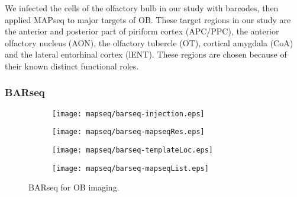 \documentclass[../dissertation.tex]{subfiles}
\begin{document}
We infected the cells of the olfactory bulb in our study with barcodes, then applied MAPseq to major targets of OB.
These target regions in our study are the anterior and posterior part of piriform cortex (APC/PPC), the anterior olfactory nucleus (AON), the olfactory tubercle (OT), cortical amygdala (CoA) and the lateral entorhinal cortex (lENT).
These regions are chosen because of their known distinct functional roles.
~\cite{mapseq034,mapseq063,mapseq064,mapseq065,mapseq066,mapseq067,mapseq068,mapseq069}

\subsubsection{BARseq}

\begin{figure}[p]
    \centering
    \begin{subfigure}[b]{0.55\textwidth}
        \texttt{[image: mapseq/barseq-injection.eps]}
        \label{fig:obbarseq-real}
    \end{subfigure}
    \hfill
    \begin{subfigure}[b]{0.3\textwidth}
        \texttt{[image: mapseq/barseq-mapseqRes.eps]}
        \label{fig:obbarseq-example}
    \end{subfigure}

    \begin{subfigure}[b]{0.3\textwidth}
        \texttt{[image: mapseq/barseq-templateLoc.eps]}
        \label{fig:obbarseq-loc}
    \end{subfigure}
    \hfill
    \begin{subfigure}[b]{0.6\textwidth}
        \texttt{[image: mapseq/barseq-mapseqList.eps]}
        \label{fig:obbarseq-mapseq}
    \end{subfigure}

    \caption{BARseq for OB imaging.}
    \label{fig:obbarseq}
\end{figure}
\end{document}
